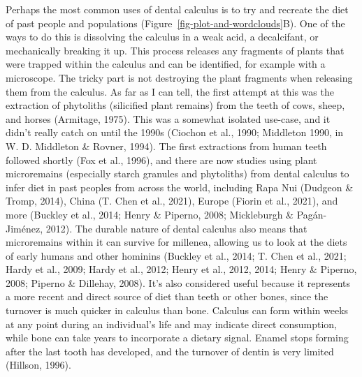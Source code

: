 \documentclass[
  letterpaper,
]{book}
\begin{document}
Perhaps the most common uses of dental calculus is to try and recreate
the diet of past people and populations
(Figure~\ref{fig-plot-and-wordclouds}B). One of the ways to do this is
dissolving the calculus in a weak acid, a decalcifant, or mechanically
breaking it up. This process releases any fragments of plants that were
trapped within the calculus and can be identified, for example with a
microscope. The tricky part is not destroying the plant fragments when
releasing them from the calculus. As far as I can tell, the first
attempt at this was the extraction of phytoliths (silicified plant
remains) from the teeth of cows, sheep, and horses (Armitage, 1975).
This was a somewhat isolated use-case, and it didn't really catch on
until the 1990s (Ciochon et al., 1990; Middleton 1990, in W. D.
Middleton \& Rovner, 1994). The first extractions from human teeth
followed shortly (Fox et al., 1996), and there are now studies using
plant microremains (especially starch granules and phytoliths) from
dental calculus to infer diet in past peoples from across the world,
including Rapa Nui (Dudgeon \& Tromp, 2014), China (T. Chen et al.,
2021), Europe (Fiorin et al., 2021), and more (Buckley et al., 2014;
Henry \& Piperno, 2008; Mickleburgh \& Pagán-Jiménez, 2012). The durable
nature of dental calculus also means that microremains within it can
survive for millenea, allowing us to look at the diets of early humans
and other hominins (Buckley et al., 2014; T. Chen et al., 2021; Hardy et
al., 2009; Hardy et al., 2012; Henry et al., 2012, 2014; Henry \&
Piperno, 2008; Piperno \& Dillehay, 2008). It's also considered useful
because it represents a more recent and direct source of diet than teeth
or other bones, since the turnover is much quicker in calculus than
bone. Calculus can form within weeks at any point during an individual's
life and may indicate direct consumption, while bone can take years to
incorporate a dietary signal. Enamel stops forming after the last tooth
has developed, and the turnover of dentin is very limited (Hillson,
1996).
\end{document}
